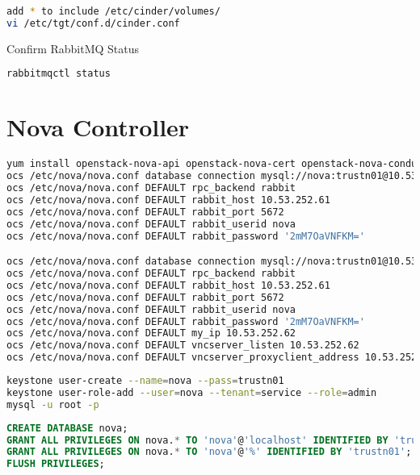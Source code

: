 \documentclass[11pt,letterpaper,oneside]{book}
\begin{document}
\begin{lstlisting}[caption={add * to include /etc/cinder/volumes/},language=bash]
add * to include /etc/cinder/volumes/
vi /etc/tgt/conf.d/cinder.conf
\end{lstlisting}


\begin{flushleft}
\begin{huge} \danger \end{huge} Confirm RabbitMQ Status
\end{flushleft}
\begin{lstlisting}[caption={},language=bash]
rabbitmqctl status
\end{lstlisting}

\chapter{Nova Controller}

\begin{lstlisting}[caption={},language=bash]
yum install openstack-nova-api openstack-nova-cert openstack-nova-conductor openstack-nova-console openstack-nova-novncproxy openstack-nova-scheduler python-novaclient
ocs /etc/nova/nova.conf database connection mysql://nova:trustn01@10.53.252.61/nova
ocs /etc/nova/nova.conf DEFAULT rpc_backend rabbit
ocs /etc/nova/nova.conf DEFAULT rabbit_host 10.53.252.61
ocs /etc/nova/nova.conf DEFAULT rabbit_port 5672
ocs /etc/nova/nova.conf DEFAULT rabbit_userid nova
ocs /etc/nova/nova.conf DEFAULT rabbit_password '2mM7OaVNFKM='

ocs /etc/nova/nova.conf database connection mysql://nova:trustn01@10.53.252.61/nova
ocs /etc/nova/nova.conf DEFAULT rpc_backend rabbit
ocs /etc/nova/nova.conf DEFAULT rabbit_host 10.53.252.61
ocs /etc/nova/nova.conf DEFAULT rabbit_port 5672
ocs /etc/nova/nova.conf DEFAULT rabbit_userid nova
ocs /etc/nova/nova.conf DEFAULT rabbit_password '2mM7OaVNFKM='
ocs /etc/nova/nova.conf DEFAULT my_ip 10.53.252.62
ocs /etc/nova/nova.conf DEFAULT vncserver_listen 10.53.252.62
ocs /etc/nova/nova.conf DEFAULT vncserver_proxyclient_address 10.53.252.62
\end{lstlisting}

\begin{lstlisting}[caption={virctlpaw001},language=bash]
keystone user-create --name=nova --pass=trustn01 
keystone user-role-add --user=nova --tenant=service --role=admin
mysql -u root -p
\end{lstlisting}


\begin{lstlisting}[caption={virctlpaw001},language=sql]
CREATE DATABASE nova;
GRANT ALL PRIVILEGES ON nova.* TO 'nova'@'localhost' IDENTIFIED BY 'trustn01';
GRANT ALL PRIVILEGES ON nova.* TO 'nova'@'%' IDENTIFIED BY 'trustn01';
FLUSH PRIVILEGES;
\end{lstlisting}
\end{document}
